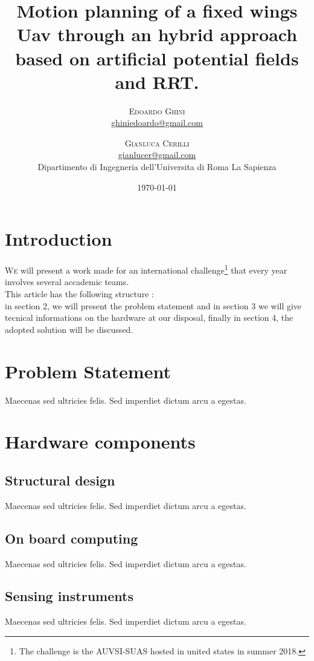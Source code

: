 \documentclass[twoside,twocolumn]{article}
\title{Motion planning of a fixed wings Uav through an hybrid approach based on artificial potential
  fields and RRT. } %
\author{%
\textsc{Edoardo Ghini} \\[1ex] %
\normalsize \href{mailto:ghiniedoardo@gmail.com}{ghiniedoardo@gmail.com} %
\and %
\textsc{Gianluca Cerilli} \\[1ex] %
\normalsize \href{mailto:gianlucer@gmail.com}{gianlucer@gmail.com}\\ %
\normalsize Dipartimento di Ingegneria dell'Universita di Roma La Sapienza\\
}
\date{\today} %
\begin{document}
\maketitle


\section{Introduction}

\lettrine[nindent=0em,lines=3]{W}e will present a work made
for an international challenge\footnote{The challenge is the AUVSI-SUAS hosted
  in united states in summer 2018.} that every year involves several accademic teams.\\
This article has the following structure : \\
in section 2, we will present the problem statement and in section 3 
 we will give tecnical informations on the hardware at our disposal,
finally in section 4, the adopted solution will be discussed.
 

\section{Problem Statement}
Maecenas sed ultricies felis. Sed imperdiet dictum arcu a egestas. 
\section{Hardware components}
\subsection{Structural design}
Maecenas sed ultricies felis. Sed imperdiet dictum arcu a egestas. 
\subsection{On board computing}
Maecenas sed ultricies felis. Sed imperdiet dictum arcu a egestas. 
\subsection{Sensing instruments}
Maecenas sed ultricies felis. Sed imperdiet dictum arcu a egestas. 
\end{document}
